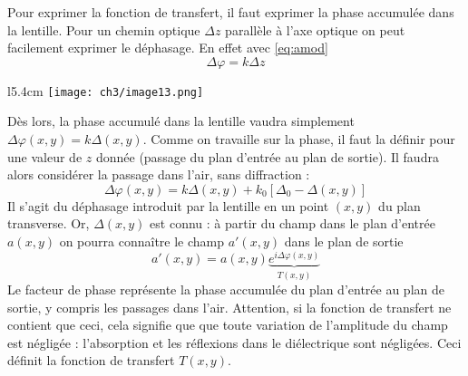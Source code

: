 	Pour exprimer la fonction de transfert, il faut exprimer la phase accumulée dans la lentille. Pour 
	un chemin optique $\Delta z$ parallèle à l'axe optique on peut facilement exprimer le déphasage. En effet 
	avec \autoref{eq:amod} 
	\begin{equation}
	\Delta\varphi = k\Delta z
	\end{equation}
	\begin{wrapfigure}[12]{l}{5.4cm}
	\texttt{[image: ch3/image13.png]}
	\end{wrapfigure}		
	Dès lors, la phase accumulé dans la lentille vaudra simplement $\Delta \varphi(x,y) = k\Delta (x,y)$. 
	Comme on travaille sur la phase, il faut la définir pour une valeur de $z$ donnée (passage du plan 
	d'entrée au 	plan de sortie). Il faudra alors considérer la passage dans l'air, sans diffraction :
	\begin{equation}
	\Delta \varphi(x,y) = k\Delta (x,y) + k_0[\Delta_0-\Delta(x,y)]
	\end{equation}
	Il s'agit du déphasage introduit par la lentille en un point $(x,y)$ du plan transverse. Or, 
	$\Delta(x,y)$ est connu : à partir du champ dans le plan d'entrée $a(x,y)$ on pourra connaître le 
	champ $a'(x,y)$	dans le plan de sortie 
	\begin{equation}
	a'(x,y) = a(x,y)\underbrace{e^{i\Delta\varphi(x,y)}}_{T(x,y)}
	\end{equation}
	Le facteur de phase représente la phase accumulée du plan d'entrée au plan de sortie, y compris les 
	passages dans l'air. Attention, si la fonction de transfert ne contient que ceci, cela signifie que 
	que toute variation de l'amplitude du champ est négligée : l’absorption et les réflexions dans le 
	diélectrique sont négligées. Ceci définit la fonction de transfert $T(x,y)$.\\
	
